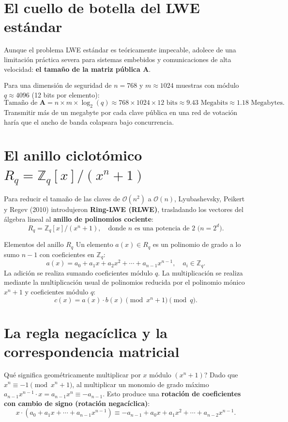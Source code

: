 \documentclass[11pt,a4paper,twoside,openright]{book}
\theoremstyle{plain}
\theoremstyle{definition}
\theoremstyle{remark}
\newcommand{\Zq}{\mathbb{Z}_q}
\newcommand{\Rq}{R_q}
\newcommand{\mm}[1]{\mathbf{#1}}
\begin{document}
\section{El cuello de botella del LWE est\'andar}

Aunque el problema LWE est\'andar es te\'oricamente impecable, adolece de una limitaci\'on pr\'actica severa para sistemas embebidos y comunicaciones de alta velocidad: \textbf{el tama\~no de la matriz p\'ublica $\mm{A}$}.

Para una dimensi\'on de seguridad de $n = 768$ y $m \approx 1024$ muestras con m\'odulo $q \approx 4096$ (12 bits por elemento):
\[
  \text{Tama\~no de } \mm{A} = n \times m \times \log_2(q) \approx 768 \times 1024 \times 12 \text{ bits} \approx 9.43 \text{ Megabits} \approx 1.18 \text{ Megabytes}.
\]
Transmitir m\'as de un megabyte por cada clave p\'ublica en una red de votaci\'on har\'ia que el ancho de banda colapsara bajo concurrencia.

\section{El anillo ciclot\'omico $\Rq = \Zq[x]/(x^n + 1)$}

Para reducir el tama\~no de las claves de $\mathcal{O}(n^2)$ a $\mathcal{O}(n)$, Lyubashevsky, Peikert y Regev (2010) introdujeron \textbf{Ring-LWE (RLWE)}, trasladando los vectores del \'algebra lineal al \textbf{anillo de polinomios cociente}:
\[
  \Rq = \Zq[x] / (x^n + 1), \quad \text{donde } n \text{ es una potencia de } 2 \text{ ($n = 2^d$)}.
\]

\begin{midef}{Elementos del anillo $\Rq$}
Un elemento $a(x) \in \Rq$ es un polinomio de grado a lo sumo $n-1$ con coeficientes en $\Zq$:
\[
  a(x) = a_0 + a_1 x + a_2 x^2 + \cdots + a_{n-1} x^{n-1}, \quad a_i \in \Zq.
\]
La adici\'on se realiza sumando coeficientes m\'odulo $q$. La multiplicaci\'on se realiza mediante la multiplicaci\'on usual de polinomios reducida por el polinomio m\'onico $x^n + 1$ y coeficientes m\'odulo $q$:
\[
  c(x) = a(x) \cdot b(x) \pmod{x^n + 1} \pmod q.
\]
\end{midef}

\section{La regla negac\'iclica y la correspondencia matricial}

\textquestiondown Qu\'e significa geom\'etricamente multiplicar por $x$ m\'odulo $(x^n + 1)$? 
Dado que $x^n \equiv -1 \pmod{x^n + 1}$, al multiplicar un monomio de grado m\'aximo $a_{n-1} x^{n-1} \cdot x = a_{n-1} x^n \equiv -a_{n-1}$.
Esto produce una \textbf{rotaci\'on de coeficientes con cambio de signo (rotaci\'on negac\'iclica)}:
\[
  x \cdot (a_0 + a_1 x + \cdots + a_{n-1} x^{n-1}) \equiv -a_{n-1} + a_0 x + a_1 x^2 + \cdots + a_{n-2} x^{n-1}.
\]
\end{document}
